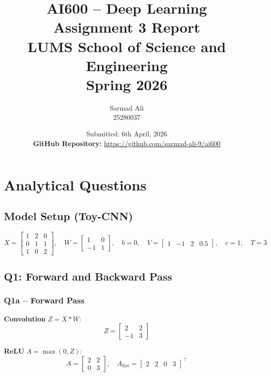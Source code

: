 \documentclass[12pt,a4paper]{article}
\title{\textbf{AI600 – Deep Learning\\Assignment 3 Report}\\
       \large LUMS School of Science and Engineering\\
       Spring 2026}
\author{Sarmad Ali \\ 25280037}
\date{Submitted: 6th April, 2026 \\[0.5em]
      \textbf{GitHub Repository:} \href{https://github.com/sarmad-ali-9/ai600}{https://github.com/sarmad-ali-9/ai600}}
\begin{document}
\maketitle
\tableofcontents
\newpage

\section{Analytical Questions}

\subsection*{Model Setup (Toy-CNN)}
\[
X = \begin{bmatrix} 1 & 2 & 0 \\ 0 & 1 & 1 \\ 1 & 0 & 2 \end{bmatrix},\quad
W = \begin{bmatrix} 1 & 0 \\ -1 & 1 \end{bmatrix},\quad
b = 0,\quad
V = \begin{bmatrix} 1 & -1 & 2 & 0.5 \end{bmatrix},\quad
c = 1,\quad T = 3
\]

\subsection*{Q1: Forward and Backward Pass}

\subsubsection*{Q1a – Forward Pass}

\textbf{Convolution} $Z = X \ast W$:
\[
Z = \begin{bmatrix} 2 & 2 \\ -1 & 3 \end{bmatrix}
\]

\textbf{ReLU} $A = \max(0, Z)$:
\[
A = \begin{bmatrix} 2 & 2 \\ 0 & 3 \end{bmatrix}, \quad
A_\text{flat} = \begin{bmatrix} 2 & 2 & 0 & 3 \end{bmatrix}^\top
\]
\end{document}
